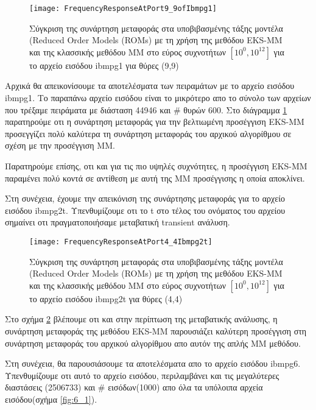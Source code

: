 \begin{figure}[h!]
\caption{Σύγκριση της συνάρτηση μεταφοράς στα υποβιβασμένης τάξης μοντέλα (\textlatin{Reduced Order Models (ROMs)} με τη χρήση της μεθόδου \textlatin{EKS-MM} και της κλασσικής μεθόδου \textlatin{MM} στο εύρος συχνοτήτων $[10^0, 10^{12}]$ για το αρχείο εισόδου \textlatin{ibmpg1} για θύρες (9,9)}
\centering
\texttt{[image: FrequencyResponseAtPort9\_9ofIbmpg1]}
\FloatBarrier
\label{fig:1_1}
\end{figure}

Αρχικά θα απεικονίσουμε τα αποτελέσματα των πειραμάτων με το αρχείο εισόδου \textlatin{ibmpg1}. Το παραπάνω αρχείο εισόδου είναι το μικρότερο απο το σύνολο των αρχείων που τρέξαμε πειράματα με διάσταση 44946 και \textlatin{\#} θυρών 600. Στο διάγραμμα \ref{fig:1_1} παρατηρούμε οτι η συνάρτηση μεταφοράς για την βελτιωμένη προσέγγιση \textlatin{EKS-MM} προσεγγίζει πολύ καλύτερα τη συνάρτηση μεταφοράς του αρχικού αλγορίθμου σε σχέση με την προσέγγιση \textlatin{MM}. 

Παρατηρούμε επίσης, οτι και για τις πιο υψηλές συχνότητες, η προσέγγιση \textlatin{EKS-MM} παραμένει πολύ κοντά σε αντίθεση με αυτή της \textlatin{MM} προσέγγισης η οποία αποκλίνει.

Στη συνέχεια, έχουμε την απεικόνιση της συνάρτησης μεταφοράς για το αρχείο εισόδου \textlatin{ibmpg2t}. Υπενθυμίζουμε οτι το \textlatin{t} στο τέλος του ονόματος του αρχείου σημαίνει οτι πραγματοποιήσαμε μεταβατική \textlatin{transient} ανάλυση.

\begin{figure}[h!]
\caption{Σύγκριση της συνάρτηση μεταφοράς στα υποβιβασμένης τάξης μοντέλα (\textlatin{Reduced Order Models (ROMs)} με τη χρήση της μεθόδου \textlatin{EKS-MM} και της κλασσικής μεθόδου \textlatin{MM} στο εύρος συχνοτήτων $[10^0, 10^{12}]$ για το αρχείο εισόδου \textlatin{ibmpg2t} για θύρες (4,4)}
\centering
\texttt{[image: FrequencyResponseAtPort4\_4Ibmpg2t]}
\label{fig:2t}
\FloatBarrier
\end{figure}

Στο σχήμα \ref{fig:2t} βλέπουμε οτι και στην περίπτωση της μεταβατικής ανάλυσης, η συνάρτηση μεταφοράς της μεθόδου \textlatin{EKS-MM} παρουσιάζει καλύτερη προσέγγιση στη συνάρτηση μεταφοράς του αρχικού αλγορίθμου απο αυτόν της απλής \textlatin{MM} μεθόδου.


Στη συνέχεια, θα παρουσιάσουμε τα αποτελέσματα απο το αρχείο εισόδου \textlatin{ibmpg6}. Υπενθυμίζουμε οτι αυτό το αρχείο εισόδου, περιλαμβάνει και τις μεγαλύτερες διαστάσεις (2506733) και \textlatin{\#} εισόδων(1000) απο όλα τα υπόλοιπα αρχεία εισόδου(σχήμα \ref{fig:6_1}).

